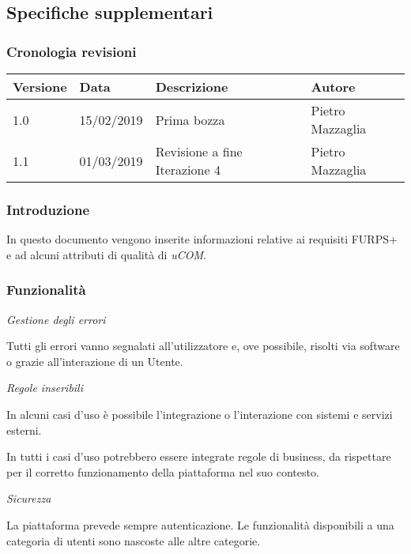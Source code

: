 \subsection{Specifiche supplementari}

\subsubsection{Cronologia revisioni}


\begin{table}[htb]
	\begin{tabular}{|l|l|l|l|}
		\hline
		
		\textbf{Versione} & \textbf{Data}       & \textbf{Descrizione} & \textbf{Autore}           \\ \hline
		
		1.0      & 15/02/2019 & Prima bozza & Pietro Mazzaglia \\ \hline
		1.1      & 01/03/2019 & Revisione a fine Iterazione 4 & Pietro Mazzaglia \\ \hline
	\end{tabular}
\end{table}

\subsubsection{Introduzione}

In questo documento vengono inserite informazioni relative ai requisiti FURPS+ e ad alcuni attributi di qualità di \textit{uCOM}.

\subsubsection{Funzionalità}

\textit{Gestione degli errori}

Tutti gli errori vanno segnalati all'utilizzatore e, ove possibile, risolti via software o grazie all'interazione di un Utente.

\textit{Regole inseribili}

In alcuni casi d'uso è possibile l'integrazione o l'interazione con sistemi e servizi esterni. 

In tutti i casi d'uso potrebbero essere integrate regole di business, da rispettare per il corretto funzionamento della piattaforma nel suo contesto.

\textit{Sicurezza}

La piattaforma prevede sempre autenticazione. Le funzionalità disponibili a una categoria di utenti sono nascoste alle altre categorie.

